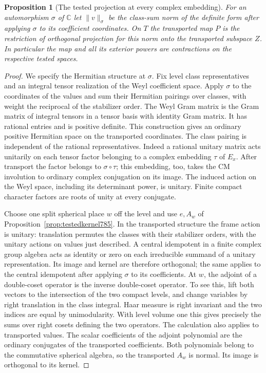 \documentclass[a4paper,11pt]{article}
\newtheorem{proposition}{Proposition}[section]
\theoremstyle{definition}
\theoremstyle{remark}
\numberwithin{equation}{section}
\begin{document}
\begin{proposition}[The tested projection at every complex embedding]
\leavevmode\label{prop:archcontraction804}
For an automorphism \(\sigma\) of \(\mathbb C\) let \(\|v\|_\sigma\)
be the class-sum norm of the definite form after applying \(\sigma\)
to its coefficient coordinates. On \(T\) the transported map \(P\)
is the restriction of orthogonal projection for this norm onto
the transported subspace \(Z\). In particular the map and all its
exterior powers are contractions on the respective tested spaces.
\end{proposition}
\begin{proof}
We specify the Hermitian structure at \(\sigma\). Fix level class
representatives and an integral tensor realization of the Weyl
coefficient space. Apply \(\sigma\) to the coordinates of the
values and sum their Hermitian pairings over classes, with weight
the reciprocal of the stabilizer order. The Weyl Gram matrix
is the Gram matrix of integral tensors in a tensor basis with
identity Gram matrix. It has rational entries and is positive
definite. This construction gives an ordinary positive Hermitian
space on the transported coordinates. The class pairing is
independent of the rational representatives. Indeed a rational
unitary matrix acts unitarily on each tensor factor belonging
to a complex embedding \(\tau\) of \(E_x\). After transport the
factor belongs to \(\sigma\circ\tau\); this embedding, too, takes
the CM involution to ordinary complex conjugation on its image.
The induced action on the Weyl space, including its determinant
power, is unitary. Finite compact character factors are roots
of unity at every conjugate.

Choose one split spherical place \(w\) off the level and use
\(e,A_w\) of Proposition~\ref{prop:testedkernel785}. In the
transported structure the frame action is unitary: translation
permutes the classes with their stabilizer orders, with the
unitary actions on values just described. A central idempotent
in a finite complex group algebra acts as identity or zero on
each irreducible summand of a unitary representation. Its image
and kernel are therefore orthogonal; the same applies to the
central idempotent after applying \(\sigma\) to its coefficients.
At \(w\), the adjoint of a double-coset operator is the inverse
double-coset operator. To see this, lift both vectors to the
intersection of the two compact levels, and change variables
by right translation in the class integral. Haar measure is
right invariant and the two indices are equal by unimodularity.
With level volume one this gives precisely the sums over right
cosets defining the two operators. The calculation also applies
to transported values. The scalar coefficients of the adjoint
polynomial are the ordinary conjugates of the transported
coefficients. Both polynomials belong to the commutative spherical
algebra, so the transported \(A_w\) is normal. Its image is
orthogonal to its kernel.


\end{proof}
\end{document}
